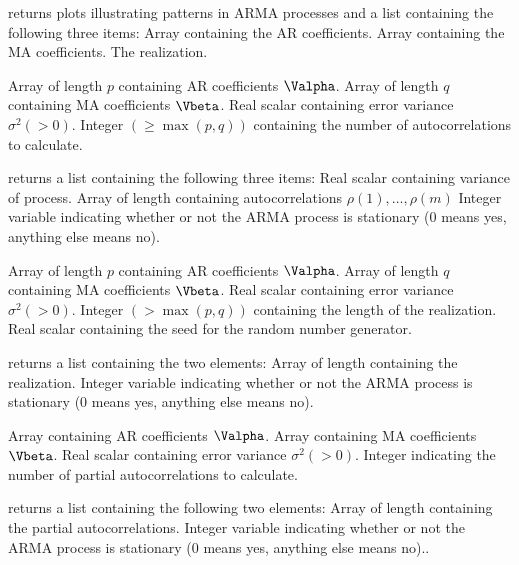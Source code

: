 \Sval
\Sitem{ }  returns plots illustrating patterns in ARMA 
processes and a list containing the following three items:
 Array containing the AR coefficients.
 Array containing the MA coefficients.
 The realization.
%
%


\Sarg
{} Array of length $p$ containing AR coefficients 
$\Valpha$.
 Array of length $q$ containing MA coefficients 
$\Vbeta$.
 Real scalar containing error variance $\sigma^2(>0)$.
 Integer $(\ge\max(p,q))$ containing the number
of autocorrelations to calculate.

\Sval
\Sitem{ }  returns a list containing the following 
three items:
 Real scalar containing variance of process.
 Array of length {} containing autocorrelations
$\rho(1), \ldots, \rho(m)$
 Integer variable indicating whether or not the ARMA
process is stationary (0 means yes, anything else means no).
%
%


\Sarg
{} Array of length $p$ containing AR coefficients 
$\Valpha$.
 Array of length $q$ containing MA coefficients 
$\Vbeta$.
 Real scalar containing error variance $\sigma^2(>0)$.
 Integer $(>\max(p,q))$ containing the length of
the realization.
 Real scalar containing the seed for the random
number generator.

\Sval
\Sitem{ }  returns a list containing the two elements:
 Array of length {} containing the realization.
 Integer variable indicating whether or not the ARMA
process is stationary (0 means yes, anything else means no).
%
%


\Sarg
{} Array containing AR coefficients $\Valpha$.
 Array containing MA coefficients $\Vbeta$.
 Real scalar containing error variance $\sigma^2(>0)$.
 Integer indicating the number of partial autocorrelations 
to calculate.

\Sval
\Sitem{ }  returns a list containing the following 
two elements:
  Array of length {} containing the partial 
autocorrelations.
 Integer variable indicating whether or not the ARMA
process is stationary (0 means yes, anything else means no)..
%
%

